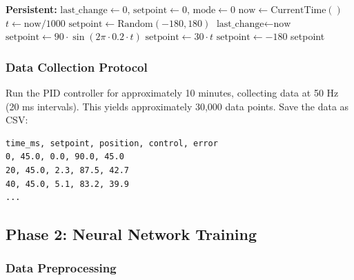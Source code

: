 \begin{algorithm}[htbp]
\caption{Reference Signal Generator}
\label{alg:reference_generator}
\begin{algorithmic}[1]
\State \textbf{Persistent:} $\text{last\_change} \gets 0$, $\text{setpoint} \gets 0$, $\text{mode} \gets 0$
    \State $\text{now} \gets \text{CurrentTime}()$
    \State $t \gets \text{now} / 1000$
     
            \State $\text{setpoint} \gets \text{Random}(-180, 180)$
            \State $\text{last\_change} \gets \text{now}$
        \EndIf
     
        \State $\text{setpoint} \gets 90 \cdot \sin(2\pi \cdot 0.2 \cdot t)$
     
        \State $\text{setpoint} \gets 30 \cdot t$
            \State $\text{setpoint} \gets -180$
        \EndIf
    \EndIf
    \State \Return setpoint
\EndFunction
\end{algorithmic}
\end{algorithm}

\subsubsection{Data Collection Protocol}

Run the PID controller for approximately 10 minutes, collecting data at 50 Hz (20 ms intervals). This yields approximately 30,000 data points. Save the data as CSV:
\begin{verbatim}
time_ms, setpoint, position, control, error
0, 45.0, 0.0, 90.0, 45.0
20, 45.0, 2.3, 87.5, 42.7
40, 45.0, 5.1, 83.2, 39.9
...
\end{verbatim}

\subsection{Phase 2: Neural Network Training}

\subsubsection{Data Preprocessing}

